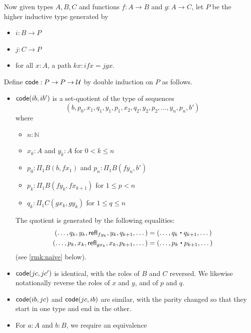 Now given types $A,B,C$ and functions $f:A\to B$ and $g:A\to C$, let $P$ be the higher inductive type generated by
\begin{itemize}
\item $i:B\to P$
\item $j:C\to P$
\item for all $x:A$, a path $k x:ifx = jgx$.
\end{itemize}
Define $\mathsf{code}:P\to P\to \mathcal{U}$ by double induction on $P$ as follows.
\begin{itemize}
\item $\mathsf{code}(ib,ib')$ is a set-quotient of the type of sequences %
  \[ (b, p_0, x_1, q_1, y_1, p_1, x_2, q_2, y_2, p_2, \dots, y_n, p_n, b') \]
  where
  \begin{itemize}
  \item $n:\mathbb{N}$
  \item $x_k:A$ and $y_k:A$ for $0<k \le n$
  \item $p_0:\Pi_1B(b,f x_1)$ and $p_n:\Pi_1B(f y_n, b')$
  \item $p_k:\Pi_1B(f y_k, fx_{k+1})$ for $1\le p < n$
  \item $q_k:\Pi_1C(gx_k, gy_k)$ for $1\le q\le n$
  \end{itemize}
  The quotient is generated by the following equalities:
  \begin{alignat*}{2}
    (\dots, q_k, y_k, \refl{fy_k}, y_k, q_{k+1},\dots)
    &= (\dots, q_k\ct q_{k+1},\dots)\\
    (\dots, p_k, x_k, \refl{gx_k}, x_k, p_{k+1},\dots)
    &= (\dots, p_k\ct p_{k+1},\dots)
  \end{alignat*}
  (see \autoref{rmk:naive} below).
\item $\mathsf{code}(jc,jc')$ is identical, with the roles of $B$ and $C$ reversed.
  We likewise notationally reverse the roles of $x$ and $y$, and of $p$ and $q$.
\item $\mathsf{code}(ib,jc)$ and $\mathsf{code}(jc,ib)$ are similar, with the parity changed so that they start in one type and end in the other.
\item For $a:A$ and $b:B$, we require an equivalence

\end{itemize}
